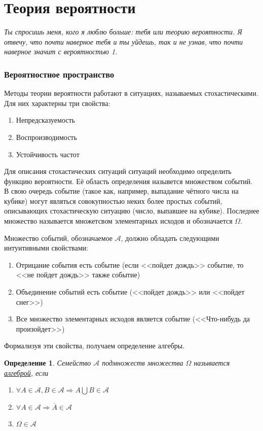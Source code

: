 \documentclass[12pt]{article}
\newtheorem{Def}{Определение}
\numberwithin{Th}{section}
\numberwithin{Def}{section}
\numberwithin{Lem}{section}
\numberwithin{St}{section}
\numberwithin{equation}{section}
\newcommand\Ev{\mathscr{A}} %
\begin{document}
\tableofcontents
\newpage

\part{Теория вероятности}
\textit{Ты спросишь меня, кого я люблю больше: тебя или теорию вероятности. Я отвечу, что почти наверное тебя и ты уйдешь, так и не узнав, что почти наверное значит с вероятностью 1.}

\newpage

\section{Вероятностное пространство}
\qquad Методы теории вероятности работают в ситуациях, называемых стохастическими. Для них характерны три свойства:
\begin{enumerate}
	\item Непредсказуемость 
	\item Воспроизводимость 
	\item Устойчивость частот
\end{enumerate}

Для описания стохастических ситуаций ситуаций необходимо определить функцию вероятности. Её область определения назывется множеством событий.
В свою очередь событие (такое как, например, выпадание чётного числа на кубике) могут являться совокупностью неких более простых событий, описывающих стохастическую ситуацию (число, выпавшее на кубике). Последнее множество называется множетсвом элементарных исходов и обозначается $\Omega$.  

Множество событий, обозначаемое $\Ev$, должно обладать следующими интуитивными свойствами:
\begin{enumerate}
	\item Отрицание события есть событие (если <<пойдет дождь>> событие, то <<не пойдет дождь>> также событие)
	\item Объединение событий есть событие (<<пойдет дождь>> или <<пойдет снег>>)
	\item Все множество элементарных исходов является событие (<<Что-нибудь да произойдет>>)
\end{enumerate}

Формализуя эти свойства, получаем определение алгебры.
\begin{Def}
Семейство $\Ev$ подмножеств множества $\Omega$  называется \\ \underline{алгеброй}, если 
\begin{enumerate}
	\item $\forall A \in \Ev, B\in \Ev \Rightarrow A \bigcup B \in \Ev$
	\item $\forall A \in \Ev \Rightarrow \overline{A} \in \Ev$
	\item $\Omega \in \Ev$
\end{enumerate}
\end{Def}
\end{document}
